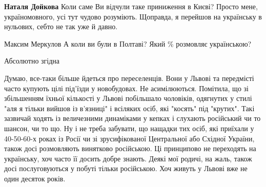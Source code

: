 \begin{itemize}
\begin{itemize}
 
\textbf{Наталя Дойкова} Коли саме Ви відчули таке приниження в Києві? Просто
мене, україномовного, усі тут чудово розуміють. Щоправда, я перейшов на
українську в нульових, себто не так уже й давно.

 
Максим Меркулов А коли ви були в Полтаві? Який \% розмовляє українською?

\end{itemize}

 
Абсолютно згідна

 

Думаю, все-таки більше йдеться про переселенців. Вони у Львові та передмісті
часто купують цілі під'їзди у новобудовах. Не асимілюються. Помітила, що зі
збільшенням їхньої кількості у Львові побільшало чоловіків, одягнутих у стилі
"аля я тільки вийшов із в'язниці" і всіляких осіб, які "косять" під "крутих".
Такі зазвичай ходять із величезними динаміками у кепках і слухають російський
чи то шансон, чи то що. Ну і не треба забувати, що нащадки тих осіб, які
приїхали у 40-50-60-х роках із Росії чи зі зрусифікованої Центральної або
Східної України, також досі розмовляють винятково російською. Ці принципово не
переходять на українську, хоч часто її досить добре знають. Деякі мої родичі,
на жаль, також досі послуговуються у побуті тільки російською. Хоч живуть у
Львові вже не один десяток років.

\begin{itemize}
 

\end{itemize}
\end{itemize}
